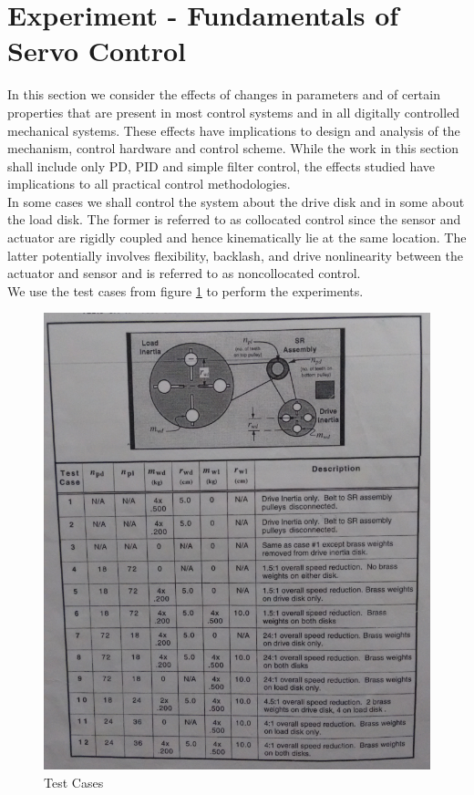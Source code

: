 \documentclass[11pt, a4paper]{article}
\begin{document}
\section{Experiment - Fundamentals of Servo Control}
In this section we consider the effects of changes in parameters and of certain properties that are present in most control systems and in all digitally controlled mechanical systems. These effects have implications to design and analysis of the mechanism, control hardware and control scheme. While the work in this section shall include only PD, PID and simple filter control, the effects studied have implications to all practical control methodologies. \\
In some cases we shall control the system about the drive disk and in some about the load disk. The former is referred to as collocated control since the sensor and actuator are rigidly coupled and hence kinematically lie at the same location. The latter potentially involves flexibility, backlash, and drive nonlinearity between the actuator and sensor and is referred to as noncollocated control.\\
We use the test cases from figure \ref{Fig8} to perform the experiments.
\begin{figure}[H]
\centering
\includegraphics[width = \textwidth]{test_cases.png}
\caption{Test Cases}
\label{Fig8}
\end{figure}
\end{document}

